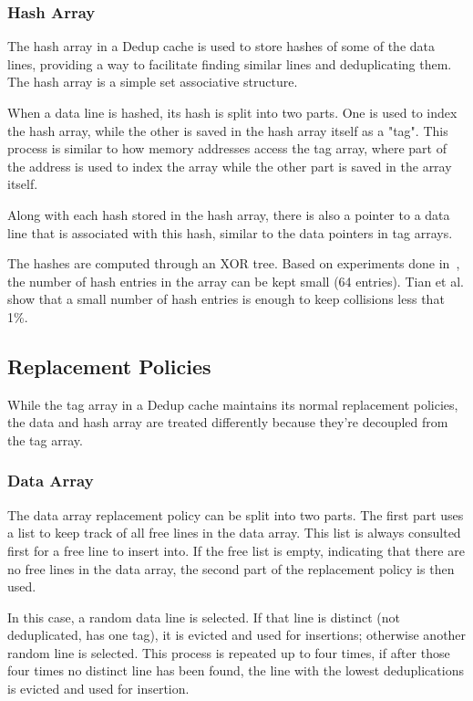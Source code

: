 \subsubsection{Hash Array}
\label{sssec:DedupHash}
The hash array in a Dedup cache is used to store hashes of some of the data lines, providing a way to facilitate finding similar lines and deduplicating them. The hash array is a simple set associative structure.\par
When a data line is hashed, its hash is split into two parts. One is used to index the hash array, while the other is saved in the hash array itself as a "tag". This process is similar to how memory addresses access the tag array, where part of the address is used to index the array while the other part is saved in the array itself.\par
Along with each hash stored in the hash array, there is also a pointer to a data line that is associated with this hash, similar to the data pointers in tag arrays.\par
The hashes are computed through an XOR tree. Based on experiments done in~\cite{dedup}, the number of hash entries in the array can be kept small (64 entries). Tian et al. show that a small number of hash entries is enough to keep collisions less that 1\%.

\subsection{Replacement Policies}
\label{ssec:DedupRepl}
While the tag array in a Dedup cache maintains its normal replacement policies, the data and hash array are treated differently because they're decoupled from the tag array.
\subsubsection{Data Array}
\label{sssec:DedupDataRepl}
The data array replacement policy can be split into two parts. The first part uses a list to keep track of all free lines in the data array. This list is always consulted first for a free line to insert into. If the free list is empty, indicating that there are no free lines in the data array, the second part of the replacement policy is then used.\par
In this case, a random data line is selected. If that line is distinct (not deduplicated, has one tag), it is evicted and used for insertions; otherwise another random line is selected. This process is repeated up to four times, if after those four times no distinct line has been found, the line with the lowest deduplications is evicted and used for insertion.
